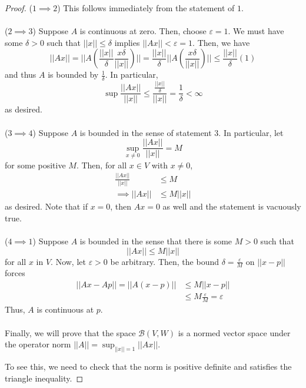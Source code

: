 \documentclass[fontsize=11pt]{scrartcl} %
\numberwithin{equation}{section} %
\numberwithin{figure}{section} %
\numberwithin{table}{section} %
\begin{document}
\begin{proof}
    ($1\implies 2$)
    This follows immediately from the statement of $1$.
    \\
    \\
    ($2\implies 3$)
    Suppose $A$ is continuous at zero. Then, choose $\varepsilon=1$. We must
    have some $\delta>0$ such that $||x||\leq\delta$ implies $||Ax||<\varepsilon=1$.
    Then, we have
    \[
        ||Ax|| = ||A\left(\frac{||x||}{\delta}\frac{x\delta}{||x||}\right)||
                = \frac{||x||}{\delta}||A\left(\frac{x\delta}{||x||}\right)||
                \leq \frac{||x||}{\delta}(1)
    \]
    and thus $A$ is bounded by $\frac{1}{\delta}$. In particular,
    \[
        \sup \frac{||Ax||}{||x||} \leq \frac{\frac{||x||}{\delta}}{||x||} =
        \frac{1}{\delta} <\infty
    \]
    as desired.
    \\
    \\  
    ($3\implies 4$)
    Suppose $A$ is bounded in the sense of statement $3$. In particular, let
    \[
        \sup_{x\neq 0} \frac{||Ax||}{||x||} = M
    \]
    for some positive $M$.
    Then, for all $x\in V$ with $x\neq 0$,
    \[
        \begin{aligned}
        \frac{||Ax||}{||x||} &\leq M\\
            \implies ||Ax|| &\leq M||x||
        \end{aligned}
    \]
    as desired. Note that if $x=0$, then $Ax=0$ as well and the statement is
    vacuously true.
    \\
    \\
    ($4\implies 1$)
    Suppose $A$ is bounded in the sense that there is some $M>0$ such that
    \[
        ||Ax||\leq M||x||
    \]
    for all $x$ in $V$. Now, let $\varepsilon >0$ be arbitrary. Then,
    the bound $\delta = \frac{\varepsilon}{M}$ on $||x-p||$ forces
    \[
        \begin{aligned}
            ||Ax-Ap|| = ||A(x-p)|| &\leq M||x-p||\\
                        &\leq M\frac{\varepsilon}{M}= \varepsilon
        \end{aligned}
    \]
    Thus, $A$ is continuous at $p$.
    \\
    \\
    Finally, we will prove that the space $\mathscr{B}(V,W)$ is a normed vector
    space under the operator norm $||A|| = \sup_{||x||=1}||Ax||$.

    To see this, we need to check that the norm is positive definite and
    satisfies the triangle inequality.


\end{proof}
\end{document}

